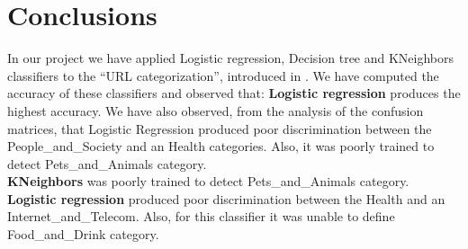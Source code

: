 \documentclass{article} %
\begin{document}
\section{Conclusions}
  In our project we have applied  Logistic regression, Decision tree and KNeighbors classifiers  to the ``URL categorization'', introduced in \cite{url_class}. We have computed the accuracy of these classifiers and observed that:
  \textbf{Logistic regression} produces the highest accuracy. We have also observed, from the analysis of the confusion matrices, that Logistic Regression produced poor discrimination between the People\_and\_Society and an Health categories. Also, it was poorly trained to detect Pets\_and\_Animals category.\\
  \textbf{KNeighbors} was poorly trained to detect Pets\_and\_Animals category.\\
  \textbf{Logistic regression} produced poor discrimination between the Health and an Internet\_and\_Telecom. Also, for this classifier it was unable to define Food\_and\_Drink category.
	
  
 
 
\end{document}
